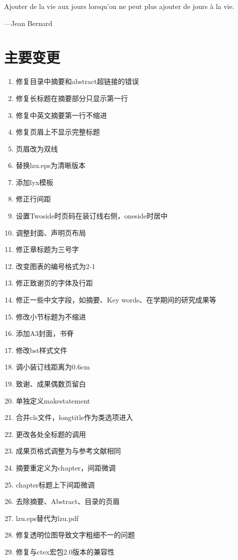 \documentclass[twoside,longtitle]{LZUthesis}
\begin{document}
\begin{thanks}
Ajouter de la vie aux jours lorsqu'on ne peut plus ajouter de jours
à la vie.

\begin{flushright}
---Jean Bernard
\par\end{flushright}
\end{thanks}


\chapter{主要变更\label{chap:changelog}}
\begin{enumerate}
\item 修复目录中摘要和abstract超链接的错误
\item 修复长标题在摘要部分只显示第一行
\item 修复中英文摘要第一行不缩进
\item 修复页眉上不显示完整标题
\item 页眉改为双线
\item 替换lzu.eps为清晰版本
\item 添加lyx模板
\item 修正行间距
\item 设置Twoside时页码在装订线右侧，oneside时居中
\item 调整封面、声明页布局
\item 修正章标题为三号字
\item 改变图表的编号格式为2-1
\item 修正致谢页的字体及行距
\item 修正一些中文字段，如摘要、Key words、在学期间的研究成果等
\item 修改小节标题为不缩进
\item 添加A3封面，书脊
\item 修改bst样式文件
\item 调小装订线距离为0.6cm
\item 致谢、成果偶数页留白
\item 单独定义makestatement
\item 合并cls文件，longtitle作为类选项进入
\item 更改各处全标题的调用
\item 成果页格式调整为与参考文献相同
\item 摘要重定义为chapter，间距微调
\item chapter标题上下间距微调
\item 去除摘要、Abstract、目录的页眉
\item lzu.eps替代为lzu.pdf
\item 修复透明位图导致文字粗细不一的问题
\item 修复与ctex宏包2.0版本的兼容性
\end{enumerate}
\end{document}
